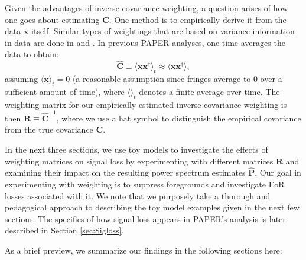 \documentclass[preprint2,numberedappendix,tighten]{aastex6}  %
\newcommand{\C}{\mathbf{C}}
\begin{document}
Given the advantages of inverse covariance weighting, a question arises of how one goes about estimating $\C$.  One method is to empirically derive it from the data $\textbf{x}$ itself.
Similar types of weightings that are based on variance information in data are done in \citet{chang_et_al2010} and \citet{switzer_et_al2015}. In previous PAPER analyses, one time-averages the data to obtain:
\begin{equation}
\widehat{\textbf{C}} \equiv \langle\textbf{xx}^{\dagger}\rangle_{t} \approx \langle  \textbf{xx}^{\dagger}\rangle,
\end{equation}
assuming $\langle\textbf{x}\rangle_{t} = 0$ (a reasonable assumption since fringes average to $0$ over a sufficient 
amount of time), where $\langle \rangle_{t}$ denotes a finite average over time. The weighting matrix for our empirically estimated inverse covariance weighting is then $
\textbf{R} \equiv \widehat{\textbf{C}}^{-1}$, where we use a hat symbol to distinguish the empirical covariance from the true covariance $\textbf{C}$.

In the next three sections, we use toy models to investigate the effects of weighting matrices on signal loss by experimenting with different matrices $\textbf{R}$ and examining their impact on the resulting power spectrum estimates $\widehat{\textbf{P}}$. Our goal in experimenting with weighting is to suppress foregrounds and investigate EoR losses associated with it. We note that we purposely take a thorough and pedagogical approach to describing the toy model examples given in the next few sections. The specifics of how signal loss appears in PAPER's analysis is later described in Section \ref{sec:Sigloss}.


As a brief preview, we summarize our findings in the following sections here:
\end{document}

